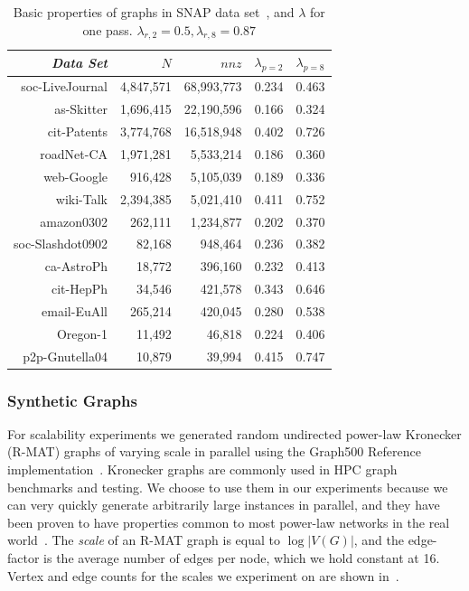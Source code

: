 \begin{table}
\caption{Basic properties of graphs in SNAP data set~\cite{Leskovec-data}, and $\lambda$ for one pass. $\lambda_{r,2}=0.5,\lambda_{r,8}=0.87$}
\centering
\small
{ \begin{tabular}{ *5r }    \toprule
\emph{Data Set} & $N$ & $nnz$  & $\lambda_{p=2}$ & $\lambda_{p=8}$ \\\midrule
soc-LiveJournal & 4,847,571 & 68,993,773  &0.234& 0.463\\
as-Skitter & 1,696,415 & 22,190,596  & 0.166&0.324\\
cit-Patents & 3,774,768 & 16,518,948  & 0.402&0.726\\
roadNet-CA & 1,971,281 & 5,533,214  & 0.186&0.360\\
web-Google & 916,428 & 5,105,039  &0.189&0.336\\
wiki-Talk & 2,394,385 & 5,021,410 &0.411&0.752\\
amazon0302 & 262,111 & 1,234,877 & 0.202&0.370\\
soc-Slashdot0902 & 82,168 & 948,464  &0.236&0.382\\
ca-AstroPh & 18,772 & 396,160 & 0.232&0.413\\
cit-HepPh & 34,546 & 421,578 & 0.343&0.646\\
email-EuAll & 265,214 & 420,045 & 0.280&0.538\\
Oregon-1 & 11,492 & 46,818  & 0.224&0.406\\
p2p-Gnutella04 & 10,879 & 39,994  & 0.415&0.747\\
 \hline
\end{tabular}\par
}
\label{tab:rw}
\end{table}

\subsubsection{Synthetic Graphs}
For scalability experiments we generated random undirected power-law Kronecker (R-MAT) graphs of varying scale in parallel using the Graph500 Reference implementation~\cite{graph500}. Kronecker graphs are commonly used in HPC graph benchmarks and testing. We choose to use them in our experiments because we can very quickly generate arbitrarily large instances in parallel, and they have been proven to have properties common to most power-law networks in the real world~\cite{kroneck}. The \emph{scale} of an R-MAT graph is equal to $\log |V(G)|$, and the edge-factor is the average number of edges per node, which we hold constant at 16. Vertex and edge counts for the scales we experiment on are shown in~.

